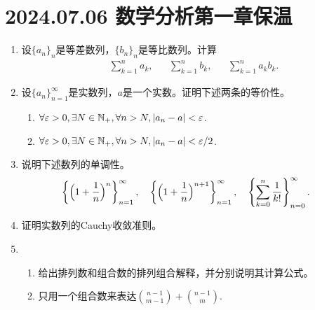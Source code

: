 \section*{2024.07.06 数学分析第一章保温}
\begin{enumerate}
    \item 设$\{a_n\}_{n}$是等差数列，$\{b_n\}_{n}$是等比数列。计算\begin{align*}
        &\sum_{k=1}^{n}a_k,&&\sum_{k=1}^{n}b_k,&&\sum_{k=1}^{n}a_kb_k.
    \end{align*}
    \item 设$\{a_n\}_{n=1}^\infty$是实数列，$a$是一个实数。证明下述两条的等价性。
    \begin{enumerate}
        \item $\forall \varepsilon>0, \exists N\in \mathbb{N_+}, \forall n>N, |a_n-a|<\varepsilon$.
        \item $\forall \varepsilon>0, \exists N\in \mathbb{N_+}, \forall n>N, |a_n-a|<\varepsilon/2$.
    \end{enumerate}
    \item 说明下述数列的单调性。
    \begin{align*}
        &\left\{\Bigl(1+\frac{1}{n}\Bigr)^n\right\}_{n=1}^\infty, && \left\{\Bigl(1+\frac{1}{n}\Bigr)^{n+1}\right\}_{n=1}^\infty, && \left\{\sum_{k=0}^{n}\frac{1}{k!}\right\}_{n=0}^\infty.
    \end{align*}
    \item 证明实数列的Cauchy收敛准则。
    \item \begin{enumerate}
        \item 给出排列数和组合数的排列组合解释，并分别说明其计算公式。
        \item 只用一个组合数来表达$\binom{n-1}{m-1}+\binom{n-1}{m}.$

\end{enumerate}
\end{enumerate}
